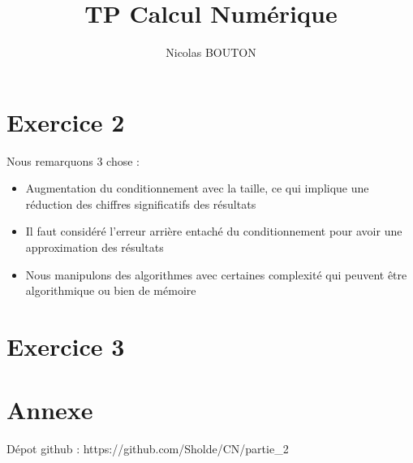 \documentclass{article}
\title{TP Calcul Numérique}
\author{Nicolas BOUTON}
\begin{document}
\maketitle

\section*{Exercice 2}

Nous remarquons 3 chose :

\begin{itemize}
\item Augmentation du conditionnement avec la taille, ce qui implique
  une réduction des chiffres significatifs des résultats
\item Il faut considéré l'erreur arrière entaché du conditionnement
  pour avoir une approximation des résultats
\item Nous manipulons des algorithmes avec certaines complexité qui
  peuvent être algorithmique ou bien de mémoire
\end{itemize}

\section*{Exercice 3}

\section*{Annexe}

Dépot github : https://github.com/Sholde/CN/partie\_2
\end{document}
